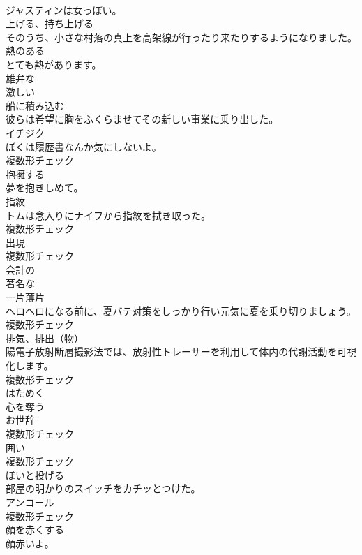 \documentclass[8pt]{extreport}
\begin{document}
\begin{CJK}{UTF8}{min}
\\	ジャスティンは女っぽい。	
\\	[動詞]	上げる、持ち上げる	
\\	そのうち、小さな村落の真上を高架線が行ったり来たりするようになりました。	
\\	[形容詞]	熱のある	
\\	とても熱があります。	
\\	[形容詞]	雄弁な	
\\	[形容詞]	激しい	
\\	[動詞]	船に積み込む	
\\	彼らは希望に胸をふくらませてその新しい事業に乗り出した。	
\\	[名詞]	イチジク	
\\	ぼくは履歴書なんか気にしないよ。	
\\	複数形チェック
\\	[動詞]	抱擁する	
\\	夢を抱きしめて。	
\\	[名詞]	指紋	
\\	トムは念入りにナイフから指紋を拭き取った。	
\\	複数形チェック
\\	[名詞]	出現	
\\	複数形チェック
\\	[形容詞]	会計の	
\\	[形容詞]	著名な	
\\	[名詞]	一片薄片	
\\	ヘロヘロになる前に、夏バテ対策をしっかり行い元気に夏を乗り切りましょう。	
\\	複数形チェック
\\	[名詞]	排気、排出（物）	
\\	陽電子放射断層撮影法では、放射性トレーサーを利用して体内の代謝活動を可視化します。	
\\	複数形チェック
\\	[動詞]	はためく	
\\	[動詞]	心を奪う	
\\	[名詞]	お世辞	
\\	複数形チェック
\\	[名詞]	囲い	
\\	複数形チェック
\\	[動詞]	ぽいと投げる	
\\	部屋の明かりのスイッチをカチッとつけた。	
\\	[名詞]	アンコール	
\\	複数形チェック
\\	[動詞]	顔を赤くする	
\\	顔赤いよ。	

\end{CJK}
\end{document}
